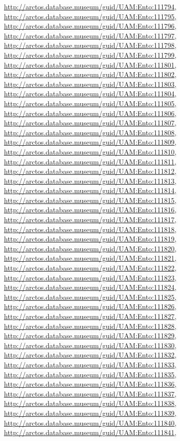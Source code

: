 \documentclass[9pt, article]{memoir}
\begin{document}
\begin{multicols}{2}
\url{http://arctos.database.museum/guid/UAM:Ento:111794}, 
\url{http://arctos.database.museum/guid/UAM:Ento:111795}, 
\url{http://arctos.database.museum/guid/UAM:Ento:111796}, 
\url{http://arctos.database.museum/guid/UAM:Ento:111797}, 
\url{http://arctos.database.museum/guid/UAM:Ento:111798}, 
\url{http://arctos.database.museum/guid/UAM:Ento:111799}, 
\url{http://arctos.database.museum/guid/UAM:Ento:111801}, 
\url{http://arctos.database.museum/guid/UAM:Ento:111802}, 
\url{http://arctos.database.museum/guid/UAM:Ento:111803}, 
\url{http://arctos.database.museum/guid/UAM:Ento:111804}, 
\url{http://arctos.database.museum/guid/UAM:Ento:111805}, 
\url{http://arctos.database.museum/guid/UAM:Ento:111806}, 
\url{http://arctos.database.museum/guid/UAM:Ento:111807}, 
\url{http://arctos.database.museum/guid/UAM:Ento:111808}, 
\url{http://arctos.database.museum/guid/UAM:Ento:111809}, 
\url{http://arctos.database.museum/guid/UAM:Ento:111810}, 
\url{http://arctos.database.museum/guid/UAM:Ento:111811}, 
\url{http://arctos.database.museum/guid/UAM:Ento:111812}, 
\url{http://arctos.database.museum/guid/UAM:Ento:111813}, 
\url{http://arctos.database.museum/guid/UAM:Ento:111814}, 
\url{http://arctos.database.museum/guid/UAM:Ento:111815}, 
\url{http://arctos.database.museum/guid/UAM:Ento:111816}, 
\url{http://arctos.database.museum/guid/UAM:Ento:111817}, 
\url{http://arctos.database.museum/guid/UAM:Ento:111818}, 
\url{http://arctos.database.museum/guid/UAM:Ento:111819}, 
\url{http://arctos.database.museum/guid/UAM:Ento:111820}, 
\url{http://arctos.database.museum/guid/UAM:Ento:111821}, 
\url{http://arctos.database.museum/guid/UAM:Ento:111822}, 
\url{http://arctos.database.museum/guid/UAM:Ento:111823}, 
\url{http://arctos.database.museum/guid/UAM:Ento:111824}, 
\url{http://arctos.database.museum/guid/UAM:Ento:111825}, 
\url{http://arctos.database.museum/guid/UAM:Ento:111826}, 
\url{http://arctos.database.museum/guid/UAM:Ento:111827}, 
\url{http://arctos.database.museum/guid/UAM:Ento:111828}, 
\url{http://arctos.database.museum/guid/UAM:Ento:111829}, 
\url{http://arctos.database.museum/guid/UAM:Ento:111830}, 
\url{http://arctos.database.museum/guid/UAM:Ento:111832}, 
\url{http://arctos.database.museum/guid/UAM:Ento:111833}, 
\url{http://arctos.database.museum/guid/UAM:Ento:111835}, 
\url{http://arctos.database.museum/guid/UAM:Ento:111836}, 
\url{http://arctos.database.museum/guid/UAM:Ento:111837}, 
\url{http://arctos.database.museum/guid/UAM:Ento:111838}, 
\url{http://arctos.database.museum/guid/UAM:Ento:111839}, 
\url{http://arctos.database.museum/guid/UAM:Ento:111840}, 
\url{http://arctos.database.museum/guid/UAM:Ento:111841}, 

\end{multicols}
\end{document}
